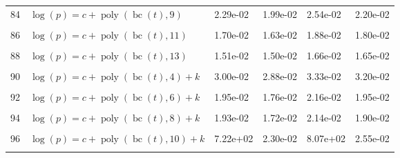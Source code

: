 \documentclass[12pt,a4paper]{article}
\DeclareMathOperator{\bc}{bc}
\DeclareMathOperator{\poly}{poly}
\begin{document}
\begin{longtable}[t]{ll>{\raggedleft\arraybackslash}p{2cm}>{\raggedleft\arraybackslash}p{2cm}>{\raggedleft\arraybackslash}p{2cm}>{\raggedleft\arraybackslash}p{2cm}}
84 & $\log(p) = c + \poly\left( \bc(t), 9 \right)$ & 2.29e-02 & 1.99e-02 & 2.54e-02 & 2.20e-02\\
\cellcolor{gray!6}{85} & \cellcolor{gray!6}{$\log(p) = c + \poly\left( \bc(t), 10 \right)$} & \cellcolor{gray!6}{7.23e+02} & \cellcolor{gray!6}{2.18e-02} & \cellcolor{gray!6}{8.09e+02} & \cellcolor{gray!6}{2.42e-02}\\
86 & $\log(p) = c + \poly\left( \bc(t), 11 \right)$ & 1.70e-02 & 1.63e-02 & 1.88e-02 & 1.80e-02\\
\cellcolor{gray!6}{87} & \cellcolor{gray!6}{$\log(p) = c + \poly\left( \bc(t), 12 \right)$} & \cellcolor{gray!6}{1.51e-02} & \cellcolor{gray!6}{1.50e-02} & \cellcolor{gray!6}{1.66e-02} & \cellcolor{gray!6}{1.65e-02}\\
88 & $\log(p) = c + \poly\left( \bc(t), 13 \right)$ & 1.51e-02 & 1.50e-02 & 1.66e-02 & 1.65e-02\\
\cellcolor{gray!6}{89} & \cellcolor{gray!6}{$\log(p) = c + \poly\left( \bc(t), 3 \right) + k$} & \cellcolor{gray!6}{2.55e-02} & \cellcolor{gray!6}{1.95e-02} & \cellcolor{gray!6}{2.82e-02} & \cellcolor{gray!6}{2.15e-02}\\
90 & $\log(p) = c + \poly\left( \bc(t), 4 \right) + k$ & 3.00e-02 & 2.88e-02 & 3.33e-02 & 3.20e-02\\
\cellcolor{gray!6}{91} & \cellcolor{gray!6}{$\log(p) = c + \poly\left( \bc(t), 5 \right) + k$} & \cellcolor{gray!6}{2.23e-02} & \cellcolor{gray!6}{1.82e-02} & \cellcolor{gray!6}{2.48e-02} & \cellcolor{gray!6}{2.01e-02}\\
92 & $\log(p) = c + \poly\left( \bc(t), 6 \right) + k$ & 1.95e-02 & 1.76e-02 & 2.16e-02 & 1.95e-02\\
\cellcolor{gray!6}{93} & \cellcolor{gray!6}{$\log(p) = c + \poly\left( \bc(t), 7 \right) + k$} & \cellcolor{gray!6}{1.71e-02} & \cellcolor{gray!6}{1.69e-02} & \cellcolor{gray!6}{1.89e-02} & \cellcolor{gray!6}{1.87e-02}\\
94 & $\log(p) = c + \poly\left( \bc(t), 8 \right) + k$ & 1.93e-02 & 1.72e-02 & 2.14e-02 & 1.90e-02\\
\cellcolor{gray!6}{95} & \cellcolor{gray!6}{$\log(p) = c + \poly\left( \bc(t), 9 \right) + k$} & \cellcolor{gray!6}{2.40e-02} & \cellcolor{gray!6}{2.11e-02} & \cellcolor{gray!6}{2.66e-02} & \cellcolor{gray!6}{2.34e-02}\\
96 & $\log(p) = c + \poly\left( \bc(t), 10 \right) + k$ & 7.22e+02 & 2.30e-02 & 8.07e+02 & 2.55e-02\\
\cellcolor{gray!6}{97} & \cellcolor{gray!6}{$\log(p) = c + \poly\left( \bc(t), 11 \right) + k$} & \cellcolor{gray!6}{1.85e-02} & \cellcolor{gray!6}{1.78e-02} & \cellcolor{gray!6}{2.05e-02} & \cellcolor{gray!6}{1.97e-02}\\

\end{longtable}
\end{document}
